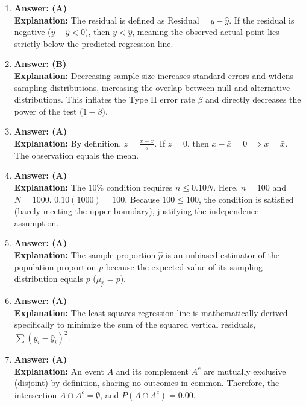 \begin{enumerate}[leftmargin=1.5em]
  \item \textbf{Answer: (A)} \\
  \textbf{Explanation:} The residual is defined as $\text{Residual} = y - \hat{y}$. If the residual is negative ($y - \hat{y} < 0$), then $y < \hat{y}$, meaning the observed actual point lies strictly below the predicted regression line.

  \item \textbf{Answer: (B)} \\
  \textbf{Explanation:} Decreasing sample size increases standard errors and widens sampling distributions, increasing the overlap between null and alternative distributions. This inflates the Type II error rate $\beta$ and directly decreases the power of the test ($1 - \beta$).

  \item \textbf{Answer: (A)} \\
  \textbf{Explanation:} By definition, $z = \frac{x - \bar{x}}{s}$. If $z = 0$, then $x - \bar{x} = 0 \implies x = \bar{x}$. The observation equals the mean.

  \item \textbf{Answer: (A)} \\
  \textbf{Explanation:} The 10\% condition requires $n \le 0.10N$. Here, $n = 100$ and $N = 1000$. $0.10(1000) = 100$. Because $100 \le 100$, the condition is satisfied (barely meeting the upper boundary), justifying the independence assumption.

  \item \textbf{Answer: (A)} \\
  \textbf{Explanation:} The sample proportion $\hat{p}$ is an unbiased estimator of the population proportion $p$ because the expected value of its sampling distribution equals $p$ ($\mu_{\hat{p}} = p$).

  \item \textbf{Answer: (A)} \\
  \textbf{Explanation:} The least-squares regression line is mathematically derived specifically to minimize the sum of the squared vertical residuals, $\sum (y_i - \hat{y}_i)^2$.

  \item \textbf{Answer: (A)} \\
  \textbf{Explanation:} An event $A$ and its complement $A^c$ are mutually exclusive (disjoint) by definition, sharing no outcomes in common. Therefore, the intersection $A \cap A^c = \emptyset$, and $P(A \cap A^c) = 0.00$.


\end{enumerate}
